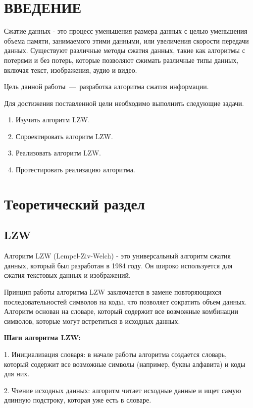 \chapter*{ВВЕДЕНИЕ}
Сжатие данных - это процесс уменьшения размера данных с целью уменьшения объема памяти, занимаемого этими данными, или увеличения скорости передачи данных. Существуют различные методы сжатия данных, такие как алгоритмы с потерями и без потерь, которые позволяют сжимать различные типы данных, включая текст, изображения, аудио и видео.

Цель данной работы~---~разработка алгоритма сжатия информации.

Для достижения поставленной цели необходимо выполнить следующие задачи.

\begin{enumerate}[label=\arabic*)]
	\item Изучить алгоритм LZW.
	\item Спроектировать алгоритм LZW.
	\item Реализовать алгоритм LZW.
	\item Протестировать реализацию алгоритма.
\end{enumerate}

\chapter{Теоретический раздел}

\section{LZW}

Алгоритм LZW (Lempel-Ziv-Welch) - это универсальный алгоритм сжатия данных, который был разработан в 1984 году. Он широко используется для сжатия текстовых данных и изображений.

Принцип работы алгоритма LZW заключается в замене повторяющихся последовательностей символов на коды, что позволяет сократить объем данных. Алгоритм основан на словаре, который содержит все возможные комбинации символов, которые могут встретиться в исходных данных.

\textbf{Шаги алгоритма LZW:}

1. Инициализация словаря: в начале работы алгоритма создается словарь, который содержит все возможные символы (например, буквы алфавита) и коды для них.

2. Чтение исходных данных: алгоритм читает исходные данные и ищет самую длинную подстроку, которая уже есть в словаре.

